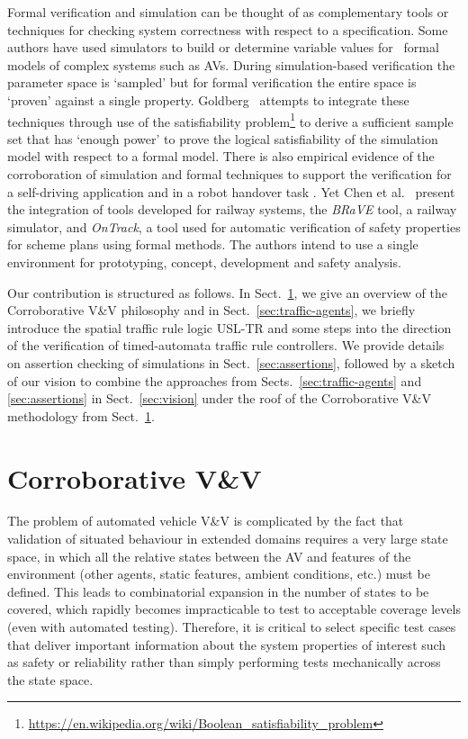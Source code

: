 \documentclass[runningheads,twocolumn,a4paper,10pt]{llncs}
\begin{document}
Formal verification and simulation can be thought of as complementary tools or techniques for checking system correctness with respect to a specification. Some authors have used simulators to build or determine variable values for~\cite{hoffmann2016autonomous} formal models of complex systems such as AVs. During simulation-based verification the parameter space is `sampled' but for formal verification the entire space is `proven' against a single property. Goldberg~\cite{goldberg2008bridging} attempts to integrate these techniques through use of the satisfiability problem\footnote{\url{https://en.wikipedia.org/wiki/Boolean_satisfiability_problem}} to derive a sufficient sample set that has `enough power' to prove the logical satisfiability of the simulation model with respect to a formal model. There is also empirical evidence of the corroboration of simulation and formal techniques to support the verification for a self-driving application \cite{domenici2017integrated} and in a robot handover task \cite{corroborative-approach}. Yet Chen et al.~\cite{7588753} present the integration of tools developed for railway systems, the \textit{BRaVE} tool, a railway simulator, and \textit{OnTrack}, a tool used for automatic verification of safety properties for scheme plans using formal methods. The authors intend to use a single environment for prototyping, concept, development and safety analysis. 

Our contribution is structured as follows. In Sect.~\ref{sec:corroborativevv}, we give an overview of the Corroborative V\&V philosophy and in Sect.~\ref{sec:traffic-agents}, we briefly introduce the spatial traffic rule logic USL-TR and some steps into the direction of the verification of timed-automata traffic rule controllers. We provide details on assertion checking of simulations in Sect.~\ref{sec:assertions}, followed by a sketch of our vision to combine the approaches from Sects.~\ref{sec:traffic-agents} and \ref{sec:assertions} in Sect.~\ref{sec:vision} under the roof of the Corroborative V\&V methodology from Sect.~\ref{sec:corroborativevv}.


\section{Corroborative V\&V}\label{sec:corroborativevv}

The problem of automated vehicle V\&V is complicated by the fact that validation of situated behaviour in extended domains requires a very large state space, in which all the relative states between the AV and features of the environment (other agents, static features, ambient conditions, etc.) must be defined. This leads to combinatorial expansion in the number of states to be covered, which rapidly becomes impracticable to test to acceptable coverage levels (even with automated testing). Therefore, it is critical to select specific test cases that deliver important information about the system properties of interest such as safety or reliability rather than simply performing tests mechanically across the state space.
\end{document}
